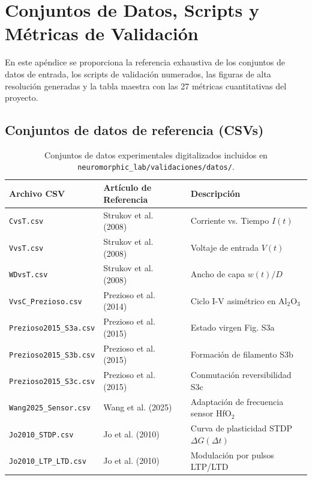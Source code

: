 \chapter{Conjuntos de Datos, Scripts y Métricas de Validación}
\label{ch:apendice_datos}

En este apéndice se proporciona la referencia exhaustiva de los conjuntos de datos de entrada, los scripts de validación numerados, las figuras de alta resolución generadas y la tabla maestra con las 27 métricas cuantitativas del proyecto.

\section{Conjuntos de datos de referencia (CSVs)}
\label{sec:datos_csv}

\begin{table}[H]
\centering
\caption{Conjuntos de datos experimentales digitalizados incluidos en \texttt{neuromorphic\_lab/validaciones/datos/}.}
\label{tab:csv_datasets}
\begin{tabular}{l l l}
\toprule
Archivo CSV & Artículo de Referencia & Descripción \\
\midrule
\texttt{CvsT.csv} & Strukov et al. (2008)~\cite{strukov2008} & Corriente vs. Tiempo $I(t)$ \\
\texttt{VvsT.csv} & Strukov et al. (2008)~\cite{strukov2008} & Voltaje de entrada $V(t)$ \\
\texttt{WDvsT.csv} & Strukov et al. (2008)~\cite{strukov2008} & Ancho de capa $w(t)/D$ \\
\texttt{VvsC\_Prezioso.csv} & Prezioso et al. (2014)~\cite{prezioso2014} & Ciclo I-V asimétrico en Al$_2$O$_3$ \\
\texttt{Prezioso2015\_S3a.csv} & Prezioso et al. (2015)~\cite{prezioso2015} & Estado virgen Fig. S3a \\
\texttt{Prezioso2015\_S3b.csv} & Prezioso et al. (2015)~\cite{prezioso2015} & Formación de filamento S3b \\
\texttt{Prezioso2015\_S3c.csv} & Prezioso et al. (2015)~\cite{prezioso2015} & Conmutación reversibilidad S3c \\
\texttt{Wang2025\_Sensor.csv} & Wang et al. (2025)~\cite{wang2025} & Adaptación de frecuencia sensor HfO$_2$ \\
\texttt{Jo2010\_STDP.csv} & Jo et al. (2010)~\cite{jo2010} & Curva de plasticidad STDP $\Delta G(\Delta t)$ \\
\texttt{Jo2010\_LTP\_LTD.csv} & Jo et al. (2010)~\cite{jo2010} & Modulación por pulsos LTP/LTD \\
\bottomrule
\end{tabular}
\end{table}

